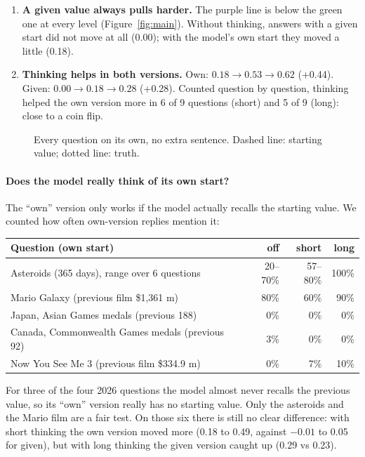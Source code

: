 \documentclass[11pt,a4paper]{article}
\begin{document}
\begin{enumerate}[leftmargin=*]
  \item \textbf{A given value always pulls harder.} The purple line is below the green one at every level (Figure~\ref{fig:main}). Without thinking, answers with a given start did not move at all (0.00); with the model's own start they moved a little (0.18).
  \item \textbf{Thinking helps in both versions.} Own: $0.18 \to 0.53 \to 0.62$ (+0.44). Given: $0.00 \to 0.18 \to 0.28$ (+0.28). Counted question by question, thinking helped the own version more in 6 of 9 questions (short) and 5 of 9 (long): close to a coin flip.
\end{enumerate}

\begin{figure}[ht]
\centering{}
\caption{Every question on its own, no extra sentence. Dashed line: starting value; dotted line: truth.}
\label{fig:items}
\end{figure}

\paragraph{Does the model really think of its own start?} The \enquote{own} version only works if the model actually recalls the starting value. We counted how often own-version replies mention it:

\begin{center}\small
\begin{tabular}{@{}lrrr@{}}
\toprule
Question (own start) & off & short & long \\
\midrule
Asteroids (365 days), range over 6 questions & 20--70\% & 57--80\% & 100\% \\
Mario Galaxy (previous film \$1,361 m) & 80\% & 60\% & 90\% \\
Japan, Asian Games medals (previous 188) & 0\% & 0\% & 0\% \\
Canada, Commonwealth Games medals (previous 92) & 3\% & 0\% & 0\% \\
Now You See Me 3 (previous film \$334.9 m) & 0\% & 7\% & 10\% \\
\bottomrule
\end{tabular}
\end{center}

For three of the four 2026 questions the model almost never recalls the previous value, so its \enquote{own} version really has no starting value. Only the asteroids and the Mario film are a fair test. On those six there is still no clear difference: with short thinking the own version moved more (0.18 to 0.49, against $-0.01$ to 0.05 for given), but with long thinking the given version caught up (0.29 vs 0.23).
\end{document}
